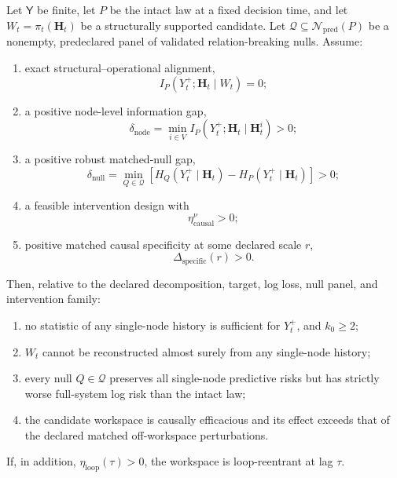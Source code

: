\begin{SRWTtheorem}
\label{SRWT:thm:operational-relationality}
Let \(\mathsf Y\) be finite, let \(P\) be the intact law at a fixed decision
time, and let \(W_t=\pi_t(\mathbf H_t)\) be a structurally supported candidate.
Let
\(\mathcal Q\subseteq\mathcal N_{\mathrm{pred}}(P)\) be a nonempty,
predeclared panel of validated relation-breaking nulls. Assume:
\begin{enumerate}
\item exact structural--operational alignment,
\[
I_P(Y_t^+;\mathbf H_t\mid W_t)=0;
\]
\item a positive node-level information gap,
\[
\delta_{\mathrm{node}}
=
\min_{i\in V}
I_P(Y_t^+;\mathbf H_t\mid\mathbf H_t^i)
>0;
\]
\item a positive robust matched-null gap,
\[
\delta_{\mathrm{null}}
=
\min_{Q\in\mathcal Q}
\left[
H_Q(Y_t^+\mid\mathbf H_t)
-
H_P(Y_t^+\mid\mathbf H_t)
\right]
>0;
\]
\item a feasible intervention design with
\[
\eta_{\mathrm{causal}}^{\nu}>0;
\]
\item positive matched causal specificity at some declared scale \(r\),
\[
\Delta_{\mathrm{specific}}(r)>0.
\]
\end{enumerate}
Then, relative to the declared decomposition, target, log loss, null panel, and
intervention family:
\begin{enumerate}
\item no statistic of any single-node history is sufficient for \(Y_t^+\), and
 \(k_0\geq2\);
\item \(W_t\) cannot be reconstructed almost surely from any single-node
 history;
\item every null \(Q\in\mathcal Q\) preserves all single-node predictive
 risks but has strictly worse full-system log risk than the intact law;
\item the candidate workspace is causally efficacious and its effect exceeds
 that of the declared matched off-workspace perturbations.
\end{enumerate}
If, in addition, \(\eta_{\mathrm{loop}}(\tau)>0\), the workspace is
loop-reentrant at lag \(\tau\).
\end{SRWTtheorem}

